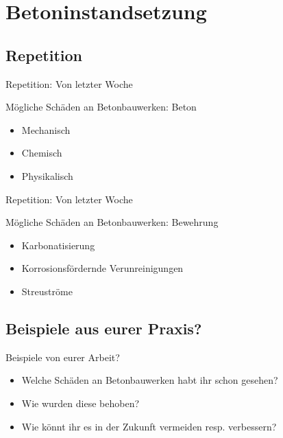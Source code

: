 \section{Betoninstandsetzung}
\subsection{Repetition}
\begin{frame}{Repetition: Von letzter Woche}
	\begin{block}{Mögliche Schäden an Betonbauwerken: Beton}
		\begin{itemize}
			\item[\textbullet] Mechanisch
			\item[\textbullet] Chemisch
			\item[\textbullet] Physikalisch
		\end{itemize}
	\end{block}
\end{frame}
\begin{frame}{Repetition: Von letzter Woche}
	\begin{block}{Mögliche Schäden an Betonbauwerken: Bewehrung}
		\begin{itemize}
			\item[\textbullet] Karbonatisierung
			\item[\textbullet] Korrosionsfördernde Verunreinigungen
			\item[\textbullet] Streuströme
		\end{itemize}
	\end{block}
\end{frame}

\subsection{Beispiele aus eurer Praxis?}
\begin{frame}{Beispiele von eurer Arbeit?}
	\begin{block}{}
		\begin{itemize}
			\item[\textbullet] Welche Schäden an Betonbauwerken habt ihr schon gesehen?
			\item[\textbullet] Wie wurden diese behoben?
			\item[\textbullet] Wie könnt ihr es in der Zukunft vermeiden resp. verbessern?
		\end{itemize}
	\end{block}
\end{frame}

